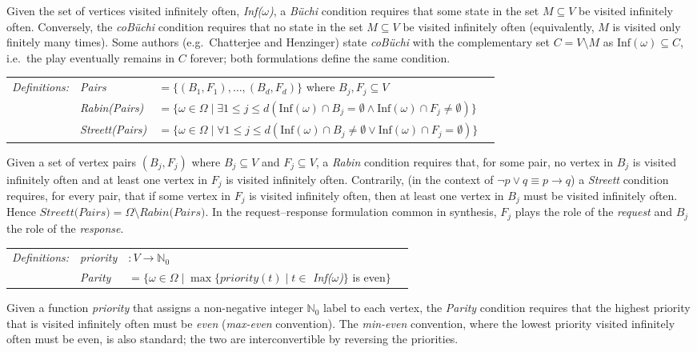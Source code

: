 \documentclass[12pt]{extarticle}
\newcommand{\definition}[1] {
    \begin{tcolorbox}[colback=mygray,colframe=mygray,sharp corners=all,top=0.01cm,bottom=0.01cm,left=0.1cm]
    \small
    \setlength{\tabcolsep}{2pt}
    \begin{tabular}{l l l l}
        \textit{Definitions:} & #1
    \end{tabular}
    \end{tcolorbox}
}
\begin{document}

Given the set of vertices visited infinitely often, \textit{Inf($\omega$)}, a \textit{B\"uchi} condition requires that some state in the set $M \subseteq V$ be visited infinitely often. Conversely, the \textit{coB\"uchi} condition requires that no state in the set $M \subseteq V$ be visited infinitely often (equivalently, $M$ is visited only finitely many times). Some authors (e.g.\ Chatterjee and Henzinger) state \textit{coB\"uchi} with the complementary set $C = V \setminus M$ as $\mathrm{Inf}(\omega) \subseteq C$, i.e.\ the play eventually remains in $C$ forever; both formulations define the same condition.

\definition{
    \textit{Pairs} &$ = \{(B_1,F_1),\ldots,(B_d,F_d)\}$ where $B_j, F_j \subseteq V$
    \\ & \textit{Rabin(Pairs)} &$ = \{\omega \in \Omega \mid  \exists 1 \leqslant j \leqslant d (\mathrm{Inf}(\omega) \cap B_j = \emptyset \wedge \mathrm{Inf}(\omega) \cap F_j \neq \emptyset)\}$
    \\ & \textit{Streett(Pairs)} &$ = \{\omega \in \Omega \mid  \forall 1 \leqslant j \leqslant d (\mathrm{Inf}(\omega) \cap B_j \neq \emptyset \vee \mathrm{Inf}(\omega) \cap F_j = \emptyset)\}$
}

Given a set of vertex pairs $(B_j,F_j)$ where $B_j \subseteq V$ and $F_j \subseteq V$, a \textit{Rabin} condition requires that, for some pair, no vertex in $B_j$ is visited infinitely often and at least one vertex in $F_j$ is visited infinitely often. Contrarily, (in the context of $\neg p \vee q \equiv p \rightarrow q$) a \textit{Streett} condition requires, for every pair, that if some vertex in $F_j$ is visited infinitely often, then at least one vertex in $B_j$ must be visited infinitely often. Hence $\textit{Streett(Pairs)} = \Omega \setminus \textit{Rabin(Pairs)}$. In the request--response formulation common in synthesis, $F_j$ plays the role of the \textit{request} and $B_j$ the role of the \textit{response}.

\definition{
    \textit{priority} &$ : V \rightarrow \mathbb{N}_0 $
    \\ & \textit{Parity} &$ =\{ \omega \in \Omega \mid \max\{priority(t) \mid t \in $ \textit{Inf($\omega$)}$\}$ is even$\}$
}

Given a function \textit{priority} that assigns a non-negative integer $\mathbb{N}_0$ label to each vertex, the \textit{Parity} condition requires that the highest priority that is visited infinitely often must be \textit{even} (\textit{max-even} convention). The \textit{min-even} convention, where the lowest priority visited infinitely often must be even, is also standard; the two are interconvertible by reversing the priorities.
\end{document}
